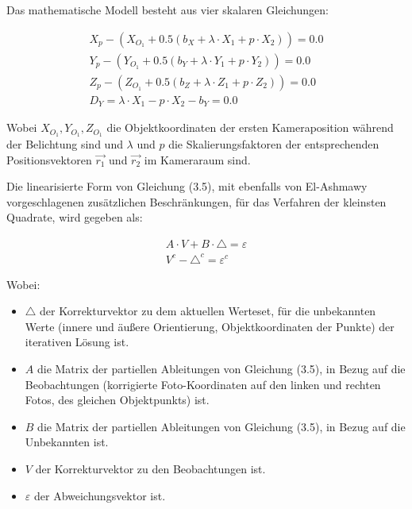 Das mathematische Modell besteht aus vier skalaren Gleichungen:

\begin{equation}
\begin{aligned}
X_p - (X_{O_1}+0.5(b_X+ \lambda \cdot X_1 + p \cdot X_2)) = 0.0 \\
Y_p - (Y_{O_1}+0.5(b_Y+ \lambda \cdot Y_1 + p \cdot Y_2)) = 0.0 \\
Z_p - (Z_{O_1}+0.5(b_Z+ \lambda \cdot Z_1 + p \cdot Z_2)) = 0.0 \\
D_Y = \lambda\cdot X_1-p\cdot X_2-b_Y = 0.0
\end{aligned}
\end{equation}

Wobei $X_{O_1}, Y_{O_1},Z_{O_1}$ die Objektkoordinaten der ersten Kameraposition während der Belichtung sind und $\lambda$ und $p$ die Skalierungsfaktoren der entsprechenden Positionsvektoren $\vec{r_1}$ und $\vec{r_2}$ im Kameraraum sind. 

Die linearisierte Form von Gleichung (3.5), mit ebenfalls von El-Ashmawy \cite{comparative_conditions_study} vorgeschlagenen zusätzlichen Beschränkungen, für das Verfahren der kleinsten Quadrate, wird gegeben als:

\begin{equation}
\begin{aligned}
A\cdot V + B\cdot \triangle = \varepsilon \\
V^c - \triangle^c = \varepsilon^c
\end{aligned}
\end{equation}


Wobei:
\begin{itemize}
\item $\triangle$ der Korrekturvektor zu dem aktuellen Werteset, für die unbekannten Werte (innere und äußere Orientierung, Objektkoordinaten der Punkte) der iterativen Lösung ist.

\item $A$ die Matrix der partiellen Ableitungen von Gleichung (3.5), in Bezug auf die Beobachtungen (korrigierte Foto-Koordinaten auf den linken und rechten Fotos, des gleichen Objektpunkts) ist.

\item $B$ die Matrix der partiellen Ableitungen von Gleichung (3.5), in Bezug auf die Unbekannten  ist.

\item $V$ der Korrekturvektor zu den Beobachtungen ist.

\item $\varepsilon$ der Abweichungsvektor ist.
\end{itemize}

